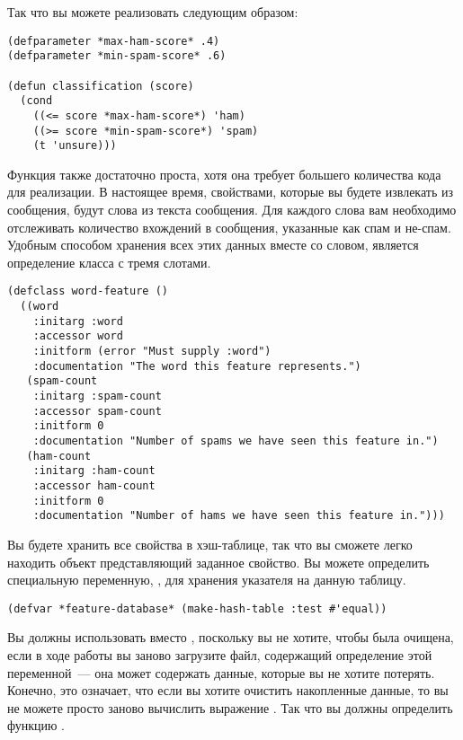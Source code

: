 Так что вы можете реализовать  следующим образом:

\begin{lstlisting}
(defparameter *max-ham-score* .4)
(defparameter *min-spam-score* .6)

(defun classification (score)
  (cond
    ((<= score *max-ham-score*) 'ham)
    ((>= score *min-spam-score*) 'spam)
    (t 'unsure)))
\end{lstlisting}

Функция  также достаточно проста, хотя она требует большего
количества кода для реализации.  В настоящее время, свойствами, которые вы будете
извлекать из сообщения, будут слова из текста сообщения.  Для каждого слова вам необходимо
отслеживать количество вхождений в сообщения, указанные как спам и не-спам.  Удобным
способом хранения всех этих данных вместе со словом, является определение класса
 с тремя слотами.

\begin{lstlisting}
(defclass word-feature ()
  ((word       
    :initarg :word
    :accessor word
    :initform (error "Must supply :word")
    :documentation "The word this feature represents.")
   (spam-count
    :initarg :spam-count
    :accessor spam-count
    :initform 0
    :documentation "Number of spams we have seen this feature in.")
   (ham-count
    :initarg :ham-count
    :accessor ham-count
    :initform 0
    :documentation "Number of hams we have seen this feature in.")))
\end{lstlisting}

Вы будете хранить все свойства в хэш-таблице, так что вы сможете легко находить объект
представляющий заданное свойство.  Вы можете определить специальную переменную,
, для хранения указателя на данную таблицу.

\begin{lstlisting}
(defvar *feature-database* (make-hash-table :test #'equal))
\end{lstlisting}

Вы должны использовать  вместо , поскольку вы не хотите,
чтобы  была очищена, если в ходе работы вы заново загрузите файл,
содержащий определение этой переменной~--- она может содержать данные, которые вы не
хотите потерять.  Конечно, это означает, что если вы хотите очистить накопленные данные,
то вы не можете просто заново вычислить выражение .  Так что вы должны
определить функцию .

